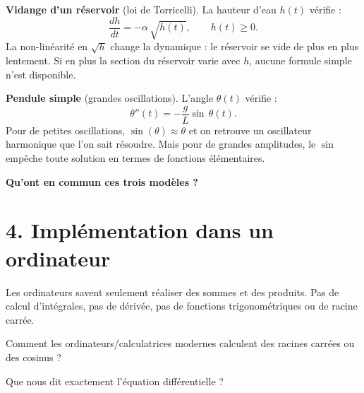 \medskip

\textbf{Vidange d'un réservoir} (loi de Torricelli).
La hauteur d'eau $h(t)$ vérifie :
\[
  \frac{dh}{dt} = -\alpha\,\sqrt{h(t)},
  \qquad h(t) \geq 0.
\]
La non-linéarité en $\sqrt{h}$ change la dynamique :
le réservoir se vide de plus en plus lentement.
Si en plus la section du réservoir varie avec $h$,
aucune formule simple n'est disponible.

\medskip

\textbf{Pendule simple} (grandes oscillations).
L'angle $\theta(t)$ vérifie :
\[
  \theta''(t)
  = -\frac{g}{L}\sin\,\theta(t).
\]
Pour de petites oscillations,
$\sin(\theta)\approx\theta$ et on retrouve
un oscillateur harmonique que l'on sait résoudre.
Mais pour de grandes amplitudes,
le $\sin$ empêche toute solution en termes
de fonctions élémentaires.

\medskip

\textbf{Qu'ont en commun ces trois modèles ?}


\section*{4. Implémentation dans un ordinateur}

Les ordinateurs savent seulement réaliser des sommes et des produits. Pas de calcul d'intégrales, pas de dérivée, pas de fonctions trigonométriques ou de racine carrée. 

Comment les ordinateurs/calculatrices modernes calculent des racines carrées ou des cosinus ? 


Que nous dit exactement l'équation différentielle ? 


